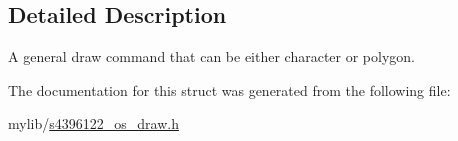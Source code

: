 \subsection{Detailed Description}
A general draw command that can be either character or polygon. 

The documentation for this struct was generated from the following file\+:\begin{DoxyCompactItemize}
\item 
mylib/\hyperlink{s4396122__os__draw_8h}{s4396122\+\_\+os\+\_\+draw.\+h}\end{DoxyCompactItemize}
